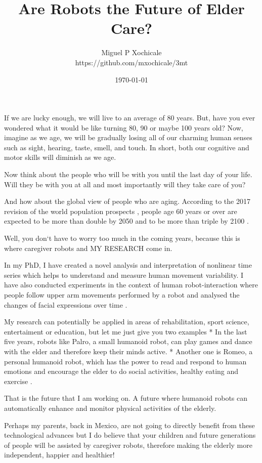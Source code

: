 \documentclass[12pt]{article}
\title{ Are Robots the Future of Elder Care?  }
\author{Miguel P Xochicale \\
https://github.com/mxochicale/3mt}
\date{\today}
\begin{document}
\maketitle

If we are lucky enough, we will live to an average of 80 years.
But, have you ever wondered what it would be like turning 80, 90 or maybe 100 years old?
Now, imagine as we age, we will be gradually losing all of our
charming human senses such as sight, hearing, taste, smell, and touch.
In short, both our cognitive and motor skills will diminish as we age.

Now think about the people who will be with you until the last day of your life.
Will they be with you at all 
and most importantly will they take care of you?

And how about the global view of people who are aging.
According to the 2017 revision of the world population prospects \cite{un2017}, 
people age 60 years or over
are expected to be more than double by 2050 and to be more than triple by 2100 \cite{unb2017}.

Well, you don`t have to worry too much in the coming years, 
because this is where caregiver robots and MY RESEARCH come in.

In my PhD, 
I have created a novel analysis and interpretation of nonlinear time series 
which helps to understand and measure human movement variability.
I have also conducted experiments in the context of human robot-interaction 
where people follow upper arm movements performed by a robot
and analysed the changes of facial expressions over time \cite{xochicale2018}.

My research can potentially be applied in areas of 
rehabilitation, sport science, entertaiment or education,
but let me just give you two examples
* In the last five years,
robots like Palro, a small humanoid robot, can play games and dance with the elder
and therefore keep their minds active.
* Another one is Romeo, a personal humanoid robot, which has the power 
to read and respond to human emotions \cite{hay2015} 
and encourage the elder to do social activities, healthy eating and exercise \cite{aronson2014}.

That is the future that I am working on.
A future where humanoid robots can automatically enhance and monitor physical activities of the elderly.

Perhaps my parents, back in Mexico, are not going to directly benefit 
from these technological advances 
but I do believe that 
your children and 
future generations of people
will be assisted by caregiver robots,
therefore making the elderly more independent, happier and healthier!
\end{document}
